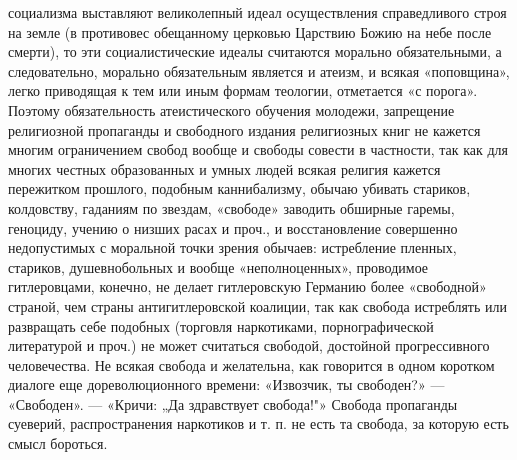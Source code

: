 социализма выставляют  великолепный идеал  осуществления справедливого
строя на  земле (в  противовес обещанному  церковью Царствию  Божию на
небе после смерти), то  эти социалистические идеалы считаются морально
обязательными,  а  следовательно,  морально  обязательным  является  и
атеизм, и всякая  «поповщина», легко приводящая к тем  или иным формам
теологии, отметается «с порога». Поэтому обязательность атеистического
обучения  молодежи,  запрещение  религиозной пропаганды  и  свободного
издания религиозных книг не  кажется многим ограничением свобод вообще
и свободы совести в частности, так как для многих честных образованных
и  умных людей  всякая религия  кажется пережитком  прошлого, подобным
каннибализму,  обычаю   убивать  стариков,  колдовству,   гаданиям  по
звездам, «свободе» заводить обширные гаремы, геноциду, учению о низших
расах и  проч., и  восстановление совершенно недопустимых  с моральной
точки  зрения обычаев:  истребление пленных,  стариков, душевнобольных
и  вообще   «неполноценных»,  проводимое  гитлеровцами,   конечно,  не
делает  гитлеровскую Германию  более «свободной»  страной, чем  страны
антигитлеровской коалиции,  так как свобода истреблять  или развращать
себе  подобных  (торговля  наркотиками,  порнографической  литературой
и  проч.)  не  может   считаться  свободой,  достойной  прогрессивного
человечества.  Не  всякая  свобода   и  желательна,  как  говорится  в
одном  коротком диалоге  еще дореволюционного  времени: «Извозчик,  ты
свободен?»  --- «Свободен».  ---  «Кричи:  „Да здравствует  свобода!"»
Свобода  пропаганды суеверий,  распространения наркотиков  и т.  п. не
есть та свобода, за которую есть смысл бороться.

